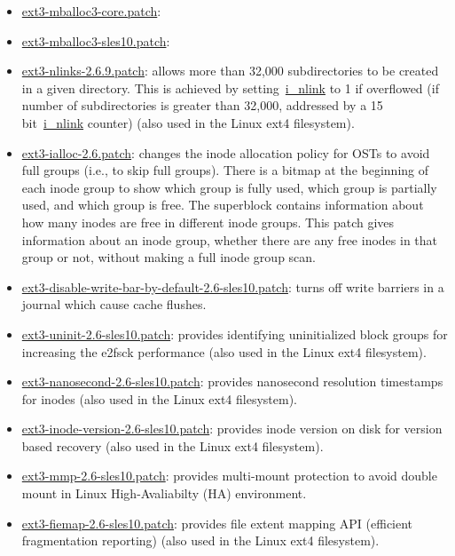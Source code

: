 \begin{itemize}

\item \url{ext3-mballoc3-core.patch}:

\item \url{ext3-mballoc3-sles10.patch}: 

\item \url{ext3-nlinks-2.6.9.patch}: allows more than 32,000 subdirectories to
be created in a given directory. This is achieved by setting~\url{i_nlink} to 1
if overflowed (if number of subdirectories is greater than 32,000, addressed by
a 15 bit~\url{i_nlink} counter) (also used in the Linux ext4 filesystem).

\item \url{ext3-ialloc-2.6.patch}: changes the inode allocation policy for OSTs
to avoid full groups (i.e., to skip full groups). There is a bitmap at the
beginning of each inode group to show which group is fully used, which group is
partially used, and which group is free. The superblock contains information
about how many inodes are free in different inode groups. This patch gives
information about an inode group, whether there are any free inodes in that
group or not, without making a full inode group scan. 

\item \url{ext3-disable-write-bar-by-default-2.6-sles10.patch}: turns off write
barriers in a journal which cause cache flushes. 

\item \url{ext3-uninit-2.6-sles10.patch}: provides identifying uninitialized
block groups for increasing the e2fsck performance (also used in the Linux ext4
filesystem). 

\item \url{ext3-nanosecond-2.6-sles10.patch}: provides nanosecond resolution
timestamps for inodes (also used in the Linux ext4 filesystem).

\item \url{ext3-inode-version-2.6-sles10.patch}: provides inode version on disk
for version based recovery (also used in the Linux ext4 filesystem).

\item \url{ext3-mmp-2.6-sles10.patch}: provides multi-mount protection to avoid
double mount in Linux High-Avaliabilty (HA) environment.

\item \url{ext3-fiemap-2.6-sles10.patch}: provides file extent mapping API
(efficient fragmentation reporting) (also used in the Linux ext4 filesystem).


\end{itemize}
